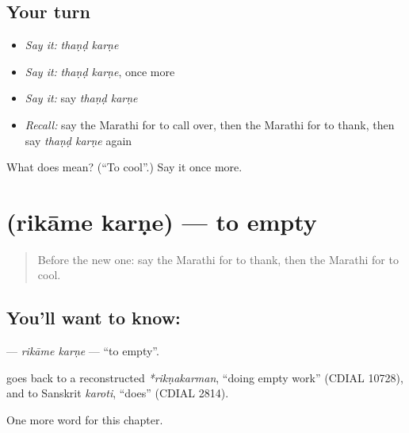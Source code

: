 \subsection*{Your turn}
\begin{itemize}
\raggedright
  \item \emph{Say it:} \emph{thaṇḍ karṇe}
  \item \emph{Say it:} \emph{thaṇḍ karṇe}, once more
  \item \emph{Say it:} say \emph{thaṇḍ karṇe}
  \item \emph{Recall:} say the Marathi for to call over, then the Marathi for to thank, then say \emph{thaṇḍ karṇe} again
\end{itemize}

\begin{tcolorbox}[breakable,colback=teal!4,colframe=teal!35!black,title={Before you move on}]
What does   mean? (\textquotedblleft{}To cool\textquotedblright{}.) Say it once more.
\end{tcolorbox}
\section[\texorpdfstring{\mr{रिकामे} \mr{करणे} (rikāme karṇe)}{रिकामे करणे (rikāme karṇe)}]{  (rikāme karṇe) — to empty}

\label{lesson:MR-C163-rikame-karne}



\begin{quote}
Before the new one: say the Marathi for to thank, then the Marathi for to cool.
\end{quote}

\subsection*{You'll want to know:  }
\textbf{ } — \emph{rikāme karṇe} — \textquotedblleft{}to empty\textquotedblright{}.

\begin{cousinweb}
\textbf{} goes back to a reconstructed \emph{*rikṇakarman}, \textquotedblleft{}doing empty work\textquotedblright{} (CDIAL 10728), and \textbf{} to Sanskrit \emph{karoti}, \textquotedblleft{}does\textquotedblright{} (CDIAL 2814).
\end{cousinweb}

\begin{grammarlens}[title={What you've built}]
One more word for this chapter.
\end{grammarlens}

